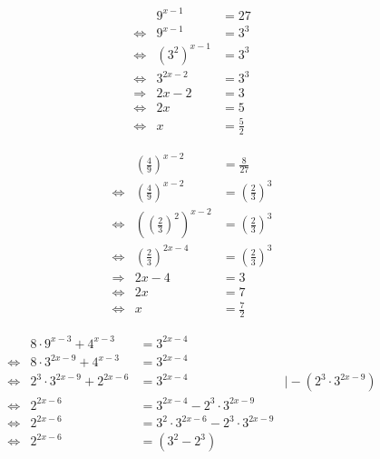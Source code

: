 \begin{uebung}[1]
    \begin{equation*}
        \begin{array}{lrl}
            & 9^{x-1} &= 27 \\
            \Leftrightarrow& 9^{x-1} &= 3^3 \\
            \Leftrightarrow& {(3^2)}^{x-1} &= 3^3 \\
            \Leftrightarrow& 3^{2x-2} &= 3^3 \\
            \Rightarrow& 2x-2 &= 3 \\
            \Leftrightarrow& 2x &= 5 \\
            \Leftrightarrow& x &= \frac{5}{2}
        \end{array}
    \end{equation*}
\end{uebung}

\begin{uebung}[2]
    \begin{equation*}
        \begin{array}{lrl}
            & {\left(\frac{4}{9}\right)}^{x-2} &= \frac{8}{27} \\
            \Leftrightarrow& {\left(\frac{4}{9}\right)}^{x-2} &=
            {\left(\frac{2}{3}\right)}^{3} \\
            \Leftrightarrow& \left({\left(\frac{2}{3}\right)}^{2}\right)^{x-2} &=
            {\left(\frac{2}{3}\right)}^{3} \\
            \Leftrightarrow& {\left(\frac{2}{3}\right)}^{2x-4} &=
            {\left(\frac{2}{3}\right)}^{3} \\
            \Rightarrow& 2x-4 &= 3 \\
            \Leftrightarrow& 2x &= 7 \\
            \Leftrightarrow& x &= \frac{7}{2}
        \end{array}
    \end{equation*}
\end{uebung}

\begin{uebung}[3]
    \begin{equation*}
        \begin{array}{lrlr}
            & 8 \cdot 9^{x-3} + 4^{x-3} &= 3^{2x-4} & \\
            \Leftrightarrow& 8 \cdot 3^{2x-9} + 4^{x-3} &= 3^{2x-4} & \\
            \Leftrightarrow& 2^3 \cdot 3^{2x-9} + 2^{2x-6} &= 3^{2x-4} &\mid -(2^3 \cdot 3^{2x-9}) \\
            \Leftrightarrow& 2^{2x-6} &= 3^{2x-4} - 2^3 \cdot 3^{2x-9} & \\
            \Leftrightarrow& 2^{2x-6} &= 3^{2} \cdot 3^{2x-6} - 2^{3} \cdot 3^{2x-9} \\
            \Leftrightarrow& 2^{2x-6} &= (3^2 - 2^3)
        \end{array}
    \end{equation*}
\end{uebung}
